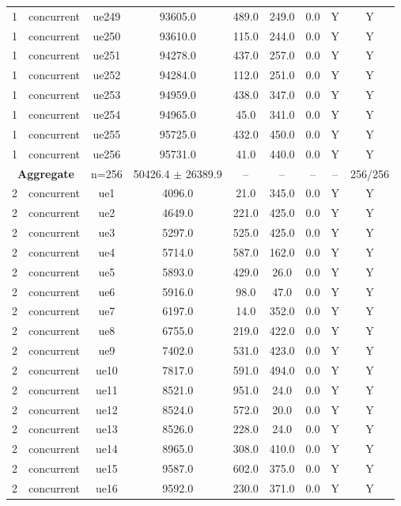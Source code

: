 \begin{table}[ht]
\begin{tabular}{|c|c|c|c|c|c|c|c|c|}
1 & concurrent & ue249 & 93605.0 & 489.0 & 249.0 & 0.0 & Y & Y \\
1 & concurrent & ue250 & 93610.0 & 115.0 & 244.0 & 0.0 & Y & Y \\
1 & concurrent & ue251 & 94278.0 & 437.0 & 257.0 & 0.0 & Y & Y \\
1 & concurrent & ue252 & 94284.0 & 112.0 & 251.0 & 0.0 & Y & Y \\
1 & concurrent & ue253 & 94959.0 & 438.0 & 347.0 & 0.0 & Y & Y \\
1 & concurrent & ue254 & 94965.0 & 45.0 & 341.0 & 0.0 & Y & Y \\
1 & concurrent & ue255 & 95725.0 & 432.0 & 450.0 & 0.0 & Y & Y \\
1 & concurrent & ue256 & 95731.0 & 41.0 & 440.0 & 0.0 & Y & Y \\
\multicolumn{2}{|c|}{\textbf{Aggregate}} & n=256 & 50426.4 $\pm$ 26389.9 & -- & -- & -- & -- & 256/256 \\
\hline
2 & concurrent & ue1 & 4096.0 & 21.0 & 345.0 & 0.0 & Y & Y \\
2 & concurrent & ue2 & 4649.0 & 221.0 & 425.0 & 0.0 & Y & Y \\
2 & concurrent & ue3 & 5297.0 & 525.0 & 425.0 & 0.0 & Y & Y \\
2 & concurrent & ue4 & 5714.0 & 587.0 & 162.0 & 0.0 & Y & Y \\
2 & concurrent & ue5 & 5893.0 & 429.0 & 26.0 & 0.0 & Y & Y \\
2 & concurrent & ue6 & 5916.0 & 98.0 & 47.0 & 0.0 & Y & Y \\
2 & concurrent & ue7 & 6197.0 & 14.0 & 352.0 & 0.0 & Y & Y \\
2 & concurrent & ue8 & 6755.0 & 219.0 & 422.0 & 0.0 & Y & Y \\
2 & concurrent & ue9 & 7402.0 & 531.0 & 423.0 & 0.0 & Y & Y \\
2 & concurrent & ue10 & 7817.0 & 591.0 & 494.0 & 0.0 & Y & Y \\
2 & concurrent & ue11 & 8521.0 & 951.0 & 24.0 & 0.0 & Y & Y \\
2 & concurrent & ue12 & 8524.0 & 572.0 & 20.0 & 0.0 & Y & Y \\
2 & concurrent & ue13 & 8526.0 & 228.0 & 24.0 & 0.0 & Y & Y \\
2 & concurrent & ue14 & 8965.0 & 308.0 & 410.0 & 0.0 & Y & Y \\
2 & concurrent & ue15 & 9587.0 & 602.0 & 375.0 & 0.0 & Y & Y \\
2 & concurrent & ue16 & 9592.0 & 230.0 & 371.0 & 0.0 & Y & Y \\

\end{tabular}
\end{table}

